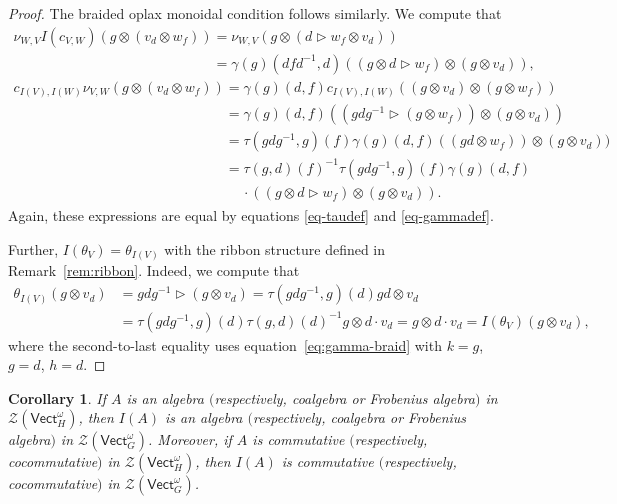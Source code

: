 \documentclass[10pt,a4paper]{amsart}
\numberwithin{equation}{section}
\newtheorem{Corollary}[Theorem]{Corollary}
\newcommand{\Vect}{\mathsf{Vect}}
\newcommand{\cZ}{\mathcal{Z}}
\newcommand{\rI}{I}
\begin{document}
\begin{proof}
The braided oplax monoidal condition follows similarly. We compute that
\begin{gather*}
 \nu_{W,V}\rI(c_{V,W})(g \otimes (v_d \otimes w_f)) = \nu_{W,V}(g \otimes (d \vartriangleright w_f \otimes v_d)) \\
\phantom{ \nu_{W,V}\rI(c_{V,W})(g \otimes (v_d \otimes w_f))}{} = \gamma(g)(dfd^{-1},d)((g\otimes d \vartriangleright w_f) \otimes (g \otimes v_d)), \\
 c_{\rI(V),\rI(W)}\nu_{V,W} (g \otimes (v_d \otimes w_f)) = \gamma(g)(d,f) c_{\rI(V),\rI(W)} ((g \otimes v_d) \otimes (g \otimes w_f)) \\
\phantom{ c_{\rI(V),\rI(W)}\nu_{V,W} (g \otimes (v_d \otimes w_f)) }{} = \gamma(g)(d,f) ((gdg^{-1} \vartriangleright (g \otimes w_f)) \otimes (g \otimes v_d)) \\
 \phantom{ c_{\rI(V),\rI(W)}\nu_{V,W} (g \otimes (v_d \otimes w_f)) }{}= \tau(gdg^{-1},g)(f) \gamma(g)(d,f) ((gd \otimes w_f)) \otimes (g \otimes v_d)) \\
\phantom{ c_{\rI(V),\rI(W)}\nu_{V,W} (g \otimes (v_d \otimes w_f)) }{} = \tau(g,d)(f)^{-1}\tau(gdg^{-1},g)(f) \gamma(g)(d,f)\\
\phantom{ c_{\rI(V),\rI(W)}\nu_{V,W} (g \otimes (v_d \otimes w_f)) }{}\quad\ \cdot((g\otimes d \vartriangleright w_f) \otimes (g \otimes v_d)).
\end{gather*}
Again, these expressions are equal by equations \eqref{eq-taudef} and \eqref{eq-gammadef}.

Further, $I(\theta_V)=\theta_{I(V)}$ with the ribbon structure defined in Remark~\ref{rem:ribbon}.
 Indeed, we compute that
 \begin{align*}
 \theta_{I(V)}(g\otimes v_d)&=gdg^{-1}\vartriangleright (g\otimes v_d)
 =\tau(gdg^{-1},g)(d)gd\otimes v_d\\
 &=\tau(gdg^{-1},g)(d)\tau(g,d)(d)^{-1} g\otimes d\cdot v_d
 =g\otimes d\cdot v_d=I(\theta_V)(g\otimes v_d),
 \end{align*}
 where the second-to-last equality uses equation~\eqref{eq:gamma-braid} with $k=g$, $g=d$, $h=d$.
\end{proof}

\begin{Corollary}\label{cor:Ipreserves}
If $A$ is an algebra $($respectively, coalgebra or Frobenius algebra$)$ in $\cZ( \Vect_H^\omega)$, then $\rI(A)$ is an algebra $($respectively, coalgebra or Frobenius algebra$)$ in $\cZ( \Vect_G^\omega)$. Moreover, if $A$ is commutative $($respectively, cocommutative$)$ in $\cZ( \Vect_H^\omega)$, then $\rI(A)$ is commutative $($respectively, cocommutative$)$ in $\cZ( \Vect_G^\omega)$.
\end{Corollary}
\end{document}
